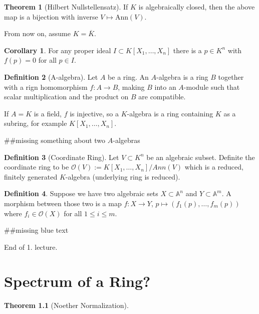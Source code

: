 \documentclass[a4paper]{book}
\theoremstyle{definition}
\newtheorem{definition}{Definition}[]
\newtheorem{theorem}[definition]{Theorem}
\newtheorem{corollary}{Corollary}
\begin{document}
\begin{thmbox}
    \begin{theorem}[Hilbert Nullstellensatz]
        If \(K\) is algebraically closed, then the above map is a bijection with inverse \(V \mapsto \text{Ann}(V)\).
    \end{theorem}
\end{thmbox}

From now on, assume \(K = \overline{K}\).
\begin{thmbox}    
    \begin{corollary}
        For any proper ideal \(I \subset K[X_1, \ldots, X_n]\) there is a \(p \in K^n\) with \(f(p) = 0\) for all \(p \in I\).
    \end{corollary}
\end{thmbox}

\begin{defbox}
    \begin{definition}[A-algebra]
        Let \(A\) be a ring. An \(A\)-algebra is a ring \(B\) together with a rign homomorphism \(f: A \longrightarrow B\), making \(B\) into an \(A\)-module such that scalar multiplication and the product on \(B\) are compatible.

        If \(A = K\) is a field, \(f\) is injective, so a \(K\)-algebra is a ring containing \(K\) as a subring, for example \(K[X_1, \ldots, X_n]\).

        \#\#missing something about two \(A\)-algebras
    \end{definition}
\end{defbox}

\begin{defbox}
    \begin{definition}[Coordinate Ring]
        Let \(V \subset K^n\) be an algebraic subset. Definite the coordinate ring to be \(\mathcal{O}(V) := K[X_1, \ldots, X_n] / Ann(V)\) which is a reduced, finitely generated \(K\)-algebra (underlying ring is reduced).
    \end{definition}
\end{defbox}

\begin{defbox}
    \begin{definition}
        Suppose we have two algebraic sets \(X \subset \mathbb{A}^n\) and \(Y \subset \mathbb{A}^m\). A morphism between those two is a map \(f: X \longrightarrow Y\), \(p \mapsto (f_1(p), \ldots, f_m(p))\) where \(f_i \in \mathcal{O}(X)\) for all \(1 \leq i \leq m\).
    \end{definition}
\end{defbox}

\#\#missing blue text

\noindent
\xrfill[0.5ex]{0.1pt}\hspace{5pt}End of 1. lecture.\hspace{5pt}\xrfill[0.5ex]{0.1pt}

\chapter{Spectrum of a Ring?}

\begin{thmbox}
    \begin{theorem}[Noether Normalization]
        
    \end{theorem}
\end{thmbox}
\end{document}
